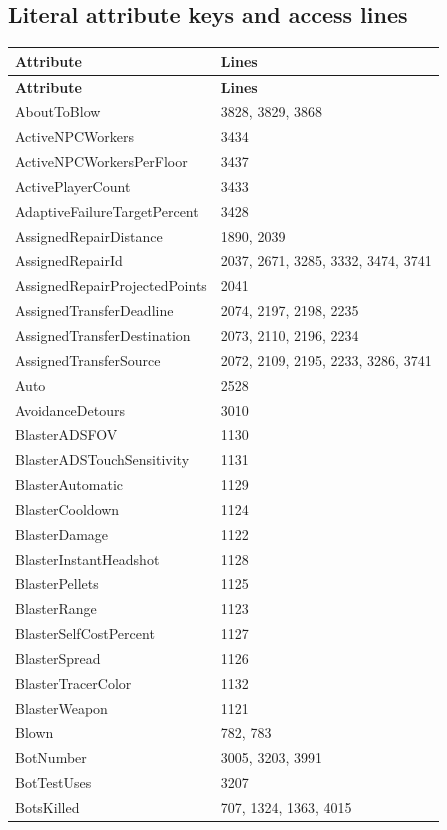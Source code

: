 \subsection{Literal attribute keys and access lines}
\begin{longtable}{p{}p{}}
\toprule
\textbf{Attribute} & \textbf{Lines} \\ \midrule
\endfirsthead
\textbf{Attribute} & \textbf{Lines} \\ \midrule
\endhead
AboutToBlow & 3828, 3829, 3868 \\
ActiveNPCWorkers & 3434 \\
ActiveNPCWorkersPerFloor & 3437 \\
ActivePlayerCount & 3433 \\
AdaptiveFailureTargetPercent & 3428 \\
AssignedRepairDistance & 1890, 2039 \\
AssignedRepairId & 2037, 2671, 3285, 3332, 3474, 3741 \\
AssignedRepairProjectedPoints & 2041 \\
AssignedTransferDeadline & 2074, 2197, 2198, 2235 \\
AssignedTransferDestination & 2073, 2110, 2196, 2234 \\
AssignedTransferSource & 2072, 2109, 2195, 2233, 3286, 3741 \\
Auto & 2528 \\
AvoidanceDetours & 3010 \\
BlasterADSFOV & 1130 \\
BlasterADSTouchSensitivity & 1131 \\
BlasterAutomatic & 1129 \\
BlasterCooldown & 1124 \\
BlasterDamage & 1122 \\
BlasterInstantHeadshot & 1128 \\
BlasterPellets & 1125 \\
BlasterRange & 1123 \\
BlasterSelfCostPercent & 1127 \\
BlasterSpread & 1126 \\
BlasterTracerColor & 1132 \\
BlasterWeapon & 1121 \\
Blown & 782, 783 \\
BotNumber & 3005, 3203, 3991 \\
BotTestUses & 3207 \\
BotsKilled & 707, 1324, 1363, 4015 \\

\end{longtable}
